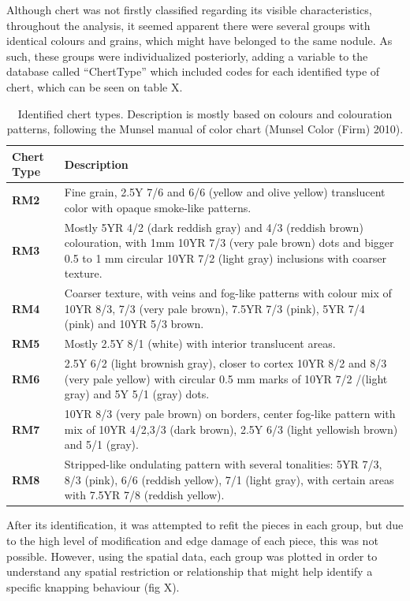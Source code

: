 \documentclass[12pt,twoside]{reedthesis}
\begin{document}
Although chert was not firstly classified regarding its visible characteristics, throughout the analysis, it seemed apparent there were several groups with identical colours and grains, which might have belonged to the same nodule. As such, these groups were individualized posteriorly, adding a variable to the database called ``ChertType'' which included codes for each identified type of chert, which can be seen on table X.
\begin{table}

\caption{\label{tab:cherttable}Identified chert types. Description is mostly based on colours and colouration patterns, following the Munsel manual of color chart (Munsel Color (Firm) 2010).}
\centering
\begin{tabular}[t]{>{\bfseries}l>{\raggedright\arraybackslash}p{10cm}}
\toprule
Chert Type & Description\\
\midrule
RM2 & Fine grain, 2.5Y 7/6 and 6/6 (yellow and olive yellow) translucent color with opaque smoke-like patterns.\\
RM3 & Mostly 5YR 4/2 (dark reddish gray) and 4/3 (reddish brown) colouration, with 1mm 10YR 7/3 (very pale brown) dots and bigger 0.5 to 1 mm circular 10YR 7/2 (light gray) inclusions with coarser texture.\\
RM4 & Coarser texture, with veins and fog-like patterns with colour mix of 10YR 8/3, 7/3 (very pale brown), 7.5YR 7/3 (pink), 5YR 7/4 (pink) and 10YR 5/3 brown.\\
RM5 & Mostly 2.5Y 8/1 (white) with interior translucent areas.\\
RM6 & 2.5Y 6/2 (light brownish gray), closer to cortex 10YR 8/2 and 8/3 (very pale yellow) with circular 0.5 mm marks of 10YR 7/2 /(light gray) and 5Y 5/1 (gray) dots.\\
\addlinespace
RM7 & 10YR 8/3 (very pale brown) on borders, center fog-like pattern with mix of 10YR 4/2,3/3 (dark brown), 2.5Y 6/3 (light yellowish brown) and 5/1 (gray).\\
RM8 & Stripped-like ondulating pattern with several tonalities: 5YR 7/3, 8/3 (pink), 6/6 (reddish yellow), 7/1 (light gray), with certain areas with 7.5YR 7/8 (reddish yellow).\\
\bottomrule
\end{tabular}
\end{table}
After its identification, it was attempted to refit the pieces in each group, but due to the high level of modification and edge damage of each piece, this was not possible. However, using the spatial data, each group was plotted in order to understand any spatial restriction or relationship that might help identify a specific knapping behaviour (fig X).
\end{document}

